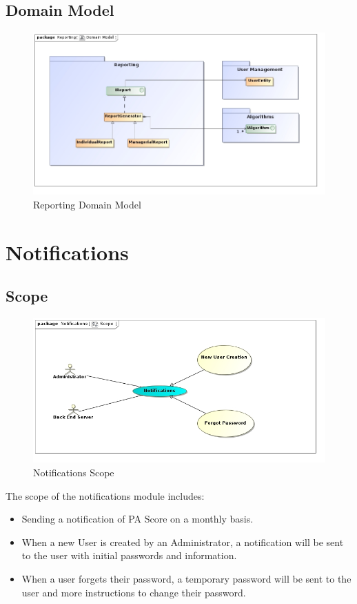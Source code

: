 \documentclass[11pt,a4paper]{article}
\begin{document}
\subsection{Domain Model}
\begin{figure}[H]
	\begin{center}
		\includegraphics[scale=0.55]{../Images/Reporting Domain Model.jpg}
		\caption{Reporting Domain Model}
	\end{center}
\end{figure}

\pagebreak

\section{Notifications}
\subsection{Scope}
\begin{figure}[H]
	\begin{center}
		\includegraphics[scale=0.6]{../Images/Notification Scope.jpg}
		\caption{Notifications Scope}
	\end{center}
\end{figure}
The scope of the notifications module includes:
\begin{itemize}
	\item Sending a notification of PA Score on a monthly basis.
	\item When a new User is created by an Administrator, a notification will be sent to the user with initial passwords and information.
	\item When a user forgets their password, a temporary password will be sent to the user and more instructions to change their password.
\end{itemize}
\end{document}
